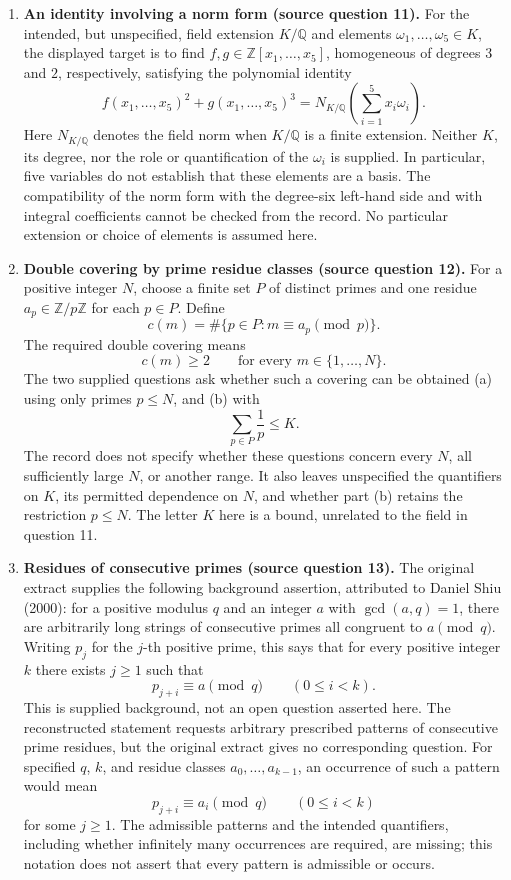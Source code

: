 \documentclass[11pt]{article}
\newcommand{\Z}{\mathbb{Z}}
\newcommand{\Q}{\mathbb{Q}}
\begin{document}
\begin{enumerate}
\item \textbf{An identity involving a norm form (source question 11).} For the intended, but unspecified, field extension \(K/\Q\) and elements \(\omega_1,\ldots,\omega_5\in K\), the displayed target is to find \(f,g\in\Z[x_1,\ldots,x_5]\), homogeneous of degrees \(3\) and \(2\), respectively, satisfying the polynomial identity
\[
f(x_1,\ldots,x_5)^2+g(x_1,\ldots,x_5)^3
=N_{K/\Q}\!\left(\sum_{i=1}^{5}x_i\omega_i\right).
\]
Here \(N_{K/\Q}\) denotes the field norm when \(K/\Q\) is a finite extension. Neither \(K\), its degree, nor the role or quantification of the \(\omega_i\) is supplied. In particular, five variables do not establish that these elements are a basis. The compatibility of the norm form with the degree-six left-hand side and with integral coefficients cannot be checked from the record. No particular extension or choice of elements is assumed here.

\item \textbf{Double covering by prime residue classes (source question 12).} For a positive integer \(N\), choose a finite set \(P\) of distinct primes and one residue \(a_p\in\Z/p\Z\) for each \(p\in P\). Define
\[
c(m)=\#\{p\in P:m\equiv a_p\pmod p\}.
\]
The required double covering means
\[
c(m)\geq2\qquad\text{for every }m\in\{1,\ldots,N\}.
\]
The two supplied questions ask whether such a covering can be obtained (a) using only primes \(p\leq N\), and (b) with
\[
\sum_{p\in P}\frac1p\leq K.
\]
The record does not specify whether these questions concern every \(N\), all sufficiently large \(N\), or another range. It also leaves unspecified the quantifiers on \(K\), its permitted dependence on \(N\), and whether part (b) retains the restriction \(p\leq N\). The letter \(K\) here is a bound, unrelated to the field in question 11.

\item \textbf{Residues of consecutive primes (source question 13).} The original extract supplies the following background assertion, attributed to Daniel Shiu (2000): for a positive modulus \(q\) and an integer \(a\) with \(\gcd(a,q)=1\), there are arbitrarily long strings of consecutive primes all congruent to \(a\pmod q\). Writing \(p_j\) for the \(j\)-th positive prime, this says that for every positive integer \(k\) there exists \(j\geq1\) such that
\[
p_{j+i}\equiv a\pmod q\qquad(0\leq i<k).
\]
This is supplied background, not an open question asserted here. The reconstructed statement requests arbitrary prescribed patterns of consecutive prime residues, but the original extract gives no corresponding question. For specified \(q\), \(k\), and residue classes \(a_0,\ldots,a_{k-1}\), an occurrence of such a pattern would mean
\[
p_{j+i}\equiv a_i\pmod q\qquad(0\leq i<k)
\]
for some \(j\geq1\). The admissible patterns and the intended quantifiers, including whether infinitely many occurrences are required, are missing; this notation does not assert that every pattern is admissible or occurs.


\end{enumerate}
\end{document}
